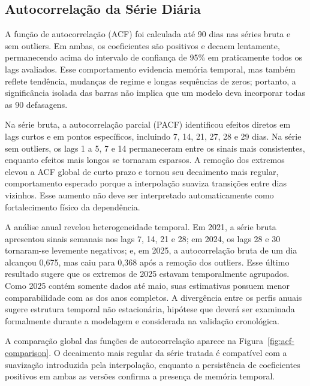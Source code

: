 \subsection{Autocorrelação da Série Diária}

A função de autocorrelação (ACF) foi calculada até 90 dias nas séries bruta e sem outliers. Em ambas, os coeficientes são positivos e decaem lentamente, permanecendo acima do intervalo de confiança de 95\% em praticamente todos os lags avaliados. Esse comportamento evidencia memória temporal, mas também reflete tendência, mudanças de regime e longas sequências de zeros; portanto, a significância isolada das barras não implica que um modelo deva incorporar todas as 90 defasagens.

Na série bruta, a autocorrelação parcial (PACF) identificou efeitos diretos em lags curtos e em pontos específicos, incluindo 7, 14, 21, 27, 28 e 29 dias. Na série sem outliers, os lags 1 a 5, 7 e 14 permaneceram entre os sinais mais consistentes, enquanto efeitos mais longos se tornaram esparsos. A remoção dos extremos elevou a ACF global de curto prazo e tornou seu decaimento mais regular, comportamento esperado porque a interpolação suaviza transições entre dias vizinhos. Esse aumento não deve ser interpretado automaticamente como fortalecimento físico da dependência.

A análise anual revelou heterogeneidade temporal. Em 2021, a série bruta apresentou sinais semanais nos lags 7, 14, 21 e 28; em 2024, os lags 28 e 30 tornaram-se levemente negativos; e, em 2025, a autocorrelação bruta de um dia alcançou 0,675, mas caiu para 0,368 após a remoção dos outliers. Esse último resultado sugere que os extremos de 2025 estavam temporalmente agrupados. Como 2025 contém somente dados até maio, suas estimativas possuem menor comparabilidade com as dos anos completos. A divergência entre os perfis anuais sugere estrutura temporal não estacionária, hipótese que deverá ser examinada formalmente durante a modelagem e considerada na validação cronológica.

A comparação global das funções de autocorrelação aparece na Figura~\ref{fig:acf-comparison}. O decaimento mais regular da série tratada é compatível com a suavização introduzida pela interpolação, enquanto a persistência de coeficientes positivos em ambas as versões confirma a presença de memória temporal.

